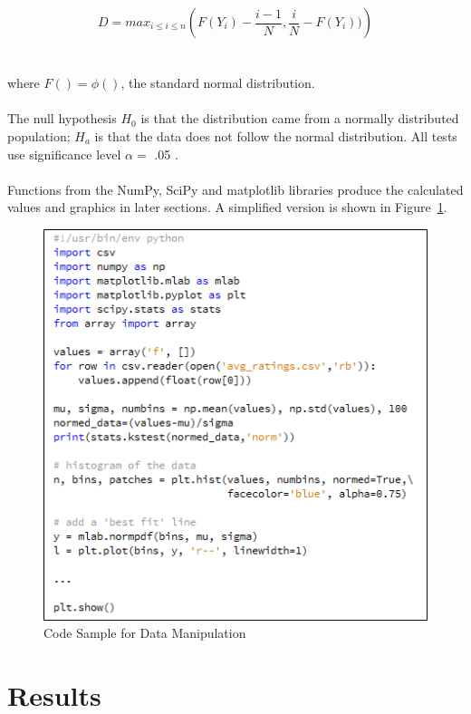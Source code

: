 \documentclass{acmtog}
\begin{document}
\begin{equation}
\label{eqn:k-s}
D = max_{i\leq i\leq n}\left ( F(Y_i) - \frac{i-1}{N},\frac{i}{N}-F(Y_i)) \right )
\end{equation}\\\\
where $F()=\phi()$, the standard normal distribution.
\\
\\
The null hypothesis $H_0$ is that the distribution came from a normally distributed population; $H_a$ is that the data does not follow the normal distribution. All tests use significance level $\alpha=$ .05
\cite{korn:handbook}.
\\
\\
Functions from the NumPy, SciPy and matplotlib libraries produce the calculated values and graphics in later sections. A simplified version is shown in Figure~\ref{fig:code}.

\begin{figure}
\centerline{\includegraphics[scale=.6]{code_sample.png}}
\caption{Code Sample for Data Manipulation}
\label{fig:code}
\end{figure}

\medskip

\section{Results}
\end{document}
